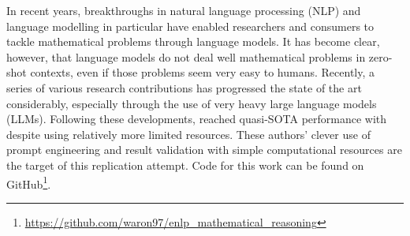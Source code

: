 In recent years, breakthroughs in natural language processing (NLP) and language modelling in particular have enabled researchers and consumers to tackle mathematical problems through language models. It has become clear, however, that language models do not deal well mathematical problems in zero-shot contexts, even if those problems seem very easy to humans. Recently, a series of various research contributions has progressed the state of the art considerably, especially through the use of very heavy large language models (LLMs). Following these developments, \citealp{imani-etal-2023-mathprompter} reached quasi-SOTA performance with despite using relatively more limited resources. These authors' clever use of prompt engineering and result validation with simple computational resources are the target of this replication attempt. Code for this work can be found on GitHub\footnote{\url{https://github.com/waron97/enlp_mathematical_reasoning}}.